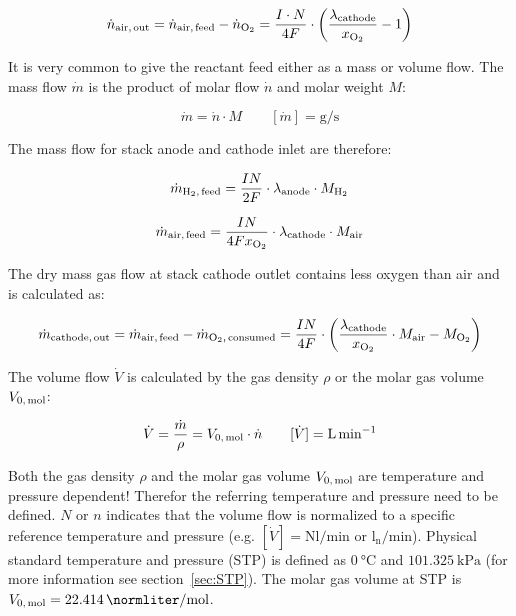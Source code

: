 \documentclass[11pt,a4paper,english,twoside]{scrreprt}
\begin{document}
\[\dot{n}_{\text{air,\,out}} =\dot{n}_{\text{air,\,feed}} -\dot{n}_{\ce{O2}} =\frac{I\cdot N}{4F} \cdot \left(\frac{\lambda_{\text{cathode}} }{x_{\ce{O2}}} -1\right)\]


It is very common to give the reactant feed either as a mass or volume flow. The mass flow $\dot{m}$ is the product of molar flow $\dot{n}$ and molar weight $M$:

\[\dot{m}=\dot{n} \cdot M \qquad [\dot{m}]=\si{\gram\per\second}\]

The mass flow for stack anode and cathode inlet are therefore:

\begin{equation}
  \label{eqn:mdot_H2_feed}
  \dot m_{\ce{H2},\,\text{feed}} = \frac{I N}{2 F} \cdot \lambda_{\text{anode}} \cdot M_{\ce{H2}}
\end{equation}

\begin{equation}
  \label{eqn:mdot_air_feed}
  \dot m_{\text{air,\,feed}} = \frac{I N}{4 F x_{\ce{O2}}} \cdot \lambda_{\text{cathode}} \cdot M_{\text{air}}
\end{equation}

The dry mass gas flow at stack cathode outlet contains less oxygen than air and is calculated as:

\begin{equation}
  \label{eqn:mdot_cathode_feed}
  \dot m_{\text{cathode,\,out}} = \dot m_{\text{air,\,feed}} - \dot m_{\ce{O2},\,\text{consumed}} =
  \frac{I N}{4 F} \cdot \left(\frac{\lambda_{\text{cathode}}}{x_{\ce{O2}}} \cdot M_{\text{air}} - M_{\ce{O2}}\right)
\end{equation}

The volume flow $\dot{V}$ is calculated by the gas density $\rho$ or the molar gas volume $V_{\text{0,\,mol}}$:

\[\dot{V}=\frac{\dot{m}}{\rho}=V_{\text{0,\,mol}} \cdot \dot{n} \qquad [\dot{V}]=\si{\liter\per\minute} \]


Both the gas density $\rho$ and the molar gas volume $V_{\text{0,\,mol}}$ are temperature and pressure dependent! Therefor the referring temperature and pressure need to be defined. $N$ or $n$ indicates that the volume flow is normalized to a specific reference temperature and pressure (e.g. $[\dot{V}]=\text{Nl/min}$ or $\text{l}_{\text{n}}\text{/min}$). Physical standard temperature and pressure (STP) is defined as $\SI{0}{\degreeCelsius}$ and $\SI{101.325}{\kilo\pascal}$ (for more information see section~\ref{sec:STP}). The molar gas volume at STP is $V_{\text{0,\,mol}}=\SI{22.414}{\normliter\per\mole}$.
\end{document}
